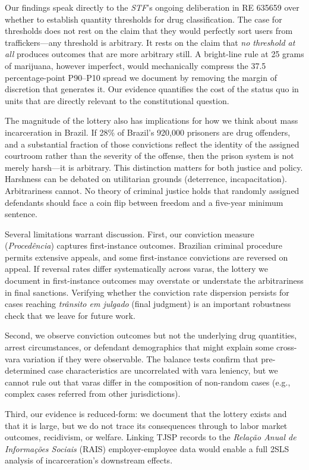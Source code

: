 \documentclass[12pt]{article}
\begin{document}
Our findings speak directly to the \textit{STF}'s ongoing deliberation in RE 635659 over whether to establish quantity thresholds for drug classification. The case for thresholds does not rest on the claim that they would perfectly sort users from traffickers---any threshold is arbitrary. It rests on the claim that \textit{no threshold at all} produces outcomes that are more arbitrary still. A bright-line rule at 25 grams of marijuana, however imperfect, would mechanically compress the 37.5 percentage-point P90--P10 spread we document by removing the margin of discretion that generates it. Our evidence quantifies the cost of the status quo in units that are directly relevant to the constitutional question.

The magnitude of the lottery also has implications for how we think about mass incarceration in Brazil. If 28\% of Brazil's 920,000 prisoners are drug offenders, and a substantial fraction of those convictions reflect the identity of the assigned courtroom rather than the severity of the offense, then the prison system is not merely harsh---it is arbitrary. This distinction matters for both justice and policy. Harshness can be debated on utilitarian grounds (deterrence, incapacitation). Arbitrariness cannot. No theory of criminal justice holds that randomly assigned defendants should face a coin flip between freedom and a five-year minimum sentence.

Several limitations warrant discussion. First, our conviction measure (\textit{Proced\^encia}) captures first-instance outcomes. Brazilian criminal procedure permits extensive appeals, and some first-instance convictions are reversed on appeal. If reversal rates differ systematically across varas, the lottery we document in first-instance outcomes may overstate or understate the arbitrariness in final sanctions. Verifying whether the conviction rate dispersion persists for cases reaching \textit{tr\^ansito em julgado} (final judgment) is an important robustness check that we leave for future work.

Second, we observe conviction outcomes but not the underlying drug quantities, arrest circumstances, or defendant demographics that might explain some cross-vara variation if they were observable. The balance tests confirm that pre-determined case characteristics are uncorrelated with vara leniency, but we cannot rule out that varas differ in the composition of non-random cases (e.g., complex cases referred from other jurisdictions).

Third, our evidence is reduced-form: we document that the lottery exists and that it is large, but we do not trace its consequences through to labor market outcomes, recidivism, or welfare. Linking TJSP records to the \textit{Rela\c{c}\~ao Anual de Informa\c{c}\~oes Sociais} (RAIS) employer-employee data would enable a full 2SLS analysis of incarceration's downstream effects.
\end{document}
